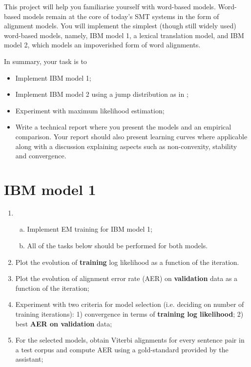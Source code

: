 
This project will help you familiarise yourself with word-based
models.  Word-based models remain at the core of today's SMT systems
in the form of alignment models.
You will implement the simplest (though still widely used) word-based
models, namely, IBM model 1, a lexical translation model, and IBM model 2, which models an impoverished form of word alignments.

In summary, your task is to

\begin{itemize}
	\item Implement IBM model 1;
	\item Implement IBM model 2 using a jump distribution as in \cite{Vogel+1996:HMMWA};
	\item Experiment with maximum likelihood estimation;
	\item Write a technical report where you present the models and an empirical comparison. Your report should also present learning curves
    where applicable along with a discussion explaining aspects such
    as non-convexity, stability and convergence.
\end{itemize}

\section{IBM model 1}

\begin{enumerate}
	\item 
	\begin{enumerate}[a)]
		\item Implement EM training \citep{Brown+1993:smt} for IBM model 1;
		\item All of the tasks below should be performed for both models.
	\end{enumerate}
	\item Plot the evolution of {\bf training} log likelihood as a function of the iteration. 
	\item Plot the evolution of alignment error rate (AER) on {\bf validation} data as a function of the iteration;
	\item Experiment with two criteria for model selection (i.e. deciding on number of training iterations): 1) convergence in terms of {\bf training log likelihood}; 2) best {\bf AER on validation} data;
	\item For the selected models, obtain Viterbi alignments for every sentence pair in a test corpus and compute AER using a gold-standard provided by the assistant;
\end{enumerate}

